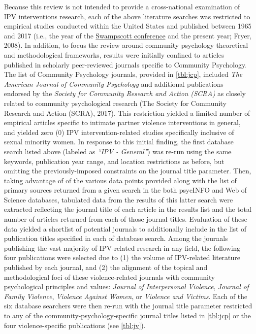 \documentclass[11pt,]{tufte-book}
\begin{document}
Because this review is not intended to provide a cross-national
examination of IPV interventions research, each of the above literature
searches was restricted to empirical studies conducted within the United
States and published between 1965 and 2017 (i.e., the year of the
\href{http://www.scra27.org/publications/tcp/tcp-past-issues/tcpsummer2014/remembering-swampscott/}{Swampscott
conference} and the present year; Fryer, 2008). In addition, to focus
the review around community psychology theoretical and methodological
frameworks, results were initially confined to articles published in
scholarly peer-reviewed journals specific to Community Psychology. The
list of Community Psychology journals, provided in
\cref{tbl:jcp}, included \emph{The American Journal of
Community Psychology} and additional publications endorsed by the
\emph{Society for Community Research and Action (SCRA)} as closely
related to community psychological research (The Society for Community
Research and Action (SCRA), 2017). This restriction yielded a limited
number of empirical articles specific to intimate partner violence
interventions in general, and yielded zero (0) IPV intervention-related
studies specifically inclusive of sexual minority women. In response to
this initial finding, the first database search listed above (labeled as
\emph{``IPV - General''}) was re-run using the same keywords,
publication year range, and location restrictions as before, but
omitting the previously-imposed constraints on the journal title
parameter. Then, taking advantage of of the various data points provided
along with the list of primary sources returned from a given search in
the both psycINFO and Web of Science databases, tabulated data from the
results of this latter search were extracted reflecting the journal
title of each article in the results list and the total number of
articles returned from each of those journal titles. Evaluation of these
data yielded a shortlist of potential journals to additionally include
in the list of publication titles specified in each of database search.
Among the journals publishing the vast majority of IPV-related research
in any field, the following four publications were selected due to (1)
the volume of IPV-related literature published by each journal, and (2)
the alignment of the topical and methodological foci of these
violence-related journals with community psychological principles and
values: \emph{Journal of Interpersonal Violence}, \emph{Journal of
Family Violence}, \emph{Violence Against Women}, or \emph{Violence and
Victims}. Each of the six database searchers were then re-run with the
journal title parameter restricted to any of the
community-psychology-specific journal titles listed in
\cref{tbl:jcp} or the four violence-specific
publications (see \cref{tbl:jv}).
\end{document}
